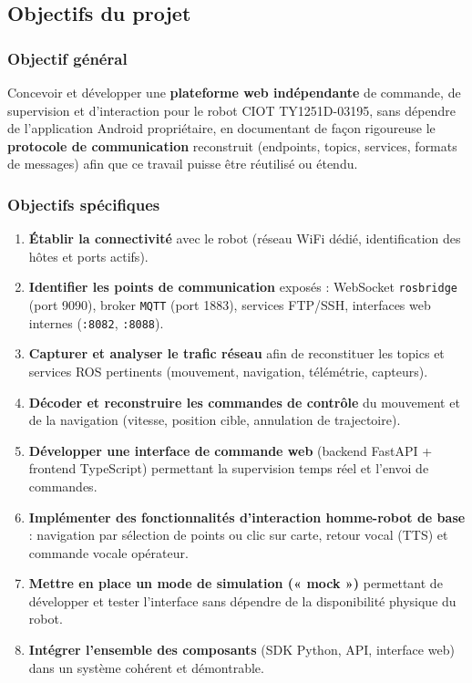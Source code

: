 \subsection{Objectifs du projet}

\subsubsection{Objectif général}

Concevoir et développer une \textbf{plateforme web indépendante} de commande,
de supervision et d'interaction pour le robot CIOT TY1251D-03195, sans
dépendre de l'application Android propriétaire, en documentant de façon
rigoureuse le \textbf{protocole de communication} reconstruit (endpoints,
topics, services, formats de messages) afin que ce travail puisse être
réutilisé ou étendu.

\subsubsection{Objectifs spécifiques}

\begin{enumerate}
    \item \textbf{Établir la connectivité} avec le robot (réseau WiFi dédié,
    identification des hôtes et ports actifs).
    \item \textbf{Identifier les points de communication} exposés : WebSocket
    \texttt{rosbridge} (port 9090), broker \texttt{MQTT} (port 1883), services
    FTP/SSH, interfaces web internes (\texttt{:8082}, \texttt{:8088}).
    \item \textbf{Capturer et analyser le trafic réseau} afin de reconstituer
    les topics et services ROS pertinents (mouvement, navigation, télémétrie,
    capteurs).
    \item \textbf{Décoder et reconstruire les commandes de contrôle} du
    mouvement et de la navigation (vitesse, position cible, annulation de
    trajectoire).
    \item \textbf{Développer une interface de commande web} (backend FastAPI
    + frontend TypeScript) permettant la supervision temps réel et l'envoi de
    commandes.
    \item \textbf{Implémenter des fonctionnalités d'interaction homme-robot de
    base} : navigation par sélection de points ou clic sur carte, retour vocal
    (TTS) et commande vocale opérateur.
    \item \textbf{Mettre en place un mode de simulation (« mock »)} permettant
    de développer et tester l'interface sans dépendre de la disponibilité
    physique du robot.
    \item \textbf{Intégrer l'ensemble des composants} (SDK Python, API, interface
    web) dans un système cohérent et démontrable.
\end{enumerate}

